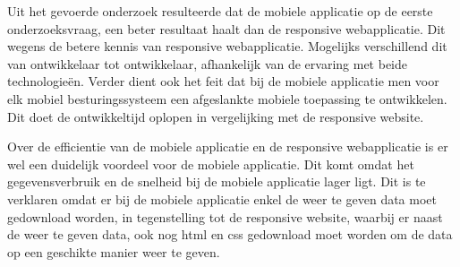 Uit het gevoerde onderzoek resulteerde dat de mobiele applicatie op de eerste onderzoeksvraag, een beter resultaat haalt dan de responsive
webapplicatie. Dit wegens de betere kennis van responsive webapplicatie. Mogelijks verschillend dit van ontwikkelaar tot ontwikkelaar,
afhankelijk van de ervaring met beide technologieën. Verder dient ook het feit dat bij de mobiele applicatie men voor elk mobiel besturingssysteem
een afgeslankte mobiele toepassing te ontwikkelen. Dit doet de ontwikkeltijd oplopen in vergelijking met de responsive website.

Over de efficientie van de mobiele applicatie en de responsive webapplicatie is er wel een duidelijk voordeel voor de mobiele applicatie.
Dit komt omdat het gegevensverbruik en de snelheid bij de mobiele applicatie lager ligt. Dit is te verklaren omdat er bij de mobiele applicatie
enkel de weer te geven data moet gedownload worden, in tegenstelling tot de responsive website, waarbij er naast de weer te geven data, ook nog html
en css gedownload moet worden om de data op een geschikte manier weer te geven.
